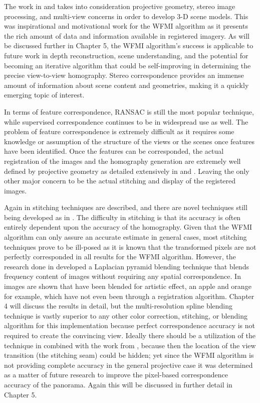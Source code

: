   The work in \cite{Walli2009} and \cite{Nilosek2009} takes into consideration projective geometry, stereo image processing, and multi-view concerns in order to develop 3-D scene models. This was inspirational and motivational work for the WFMI algorithm as it presents the rich amount of data and information available in registered imagery. As will be discussed further in Chapter 5, the WFMI algorithm's success is applicable to future work in depth reconstruction, scene understanding, and the potential for becoming an iterative algorithm that could be self-improving in determining the precise view-to-view homography. Stereo correspondence provides an immense amount of information about scene content and geometries, making it a quickly emerging topic of interest.
  
  In terms of feature correspondence, RANSAC \cite{Brown2007} is still the most popular technique, while supervised correspondence continues to be in widespread use as well. The problem of feature correspondence is extremely difficult as it requires some knowledge or assumption of the structure of the views or the scenes once features have been identified. Once the features can be corresponded, the actual  registration of the images and the homography generation are extremely well defined by projective geometry as detailed extensively in \cite{Faugeras2004} and \cite{Hartley2003}. Leaving the only other major concern to be the actual stitching and display of the registered images.
  
   Again in \cite{Zitova2003} stitching techniques are described, and there are novel techniques still being developed as in \cite{Haenselmann2009}. The difficulty in stitching is that its accuracy is often entirely dependent upon the accuracy of the homography. Given that the WFMI algorithm can only assure an accurate estimate in general cases, most stitching techniques prove to be ill-posed as it is known that the transformed pixels are not perfectly corresponded in all results for the WFMI algorithm. However, the research done in \cite{Burt1983} developed a Laplacian pyramid blending technique that blends frequency content of images without requiring any spatial correspondence. In \cite{Burt1983} images are shown that have been blended for artistic effect, an apple and orange for example, which have not even been through a registration algorithm. Chapter 4 will discuss the results in detail, but the multi-resolution spline blending technique is vastly superior to any other color correction, stitching, or blending algorithm for this implementation because perfect correspondence accuracy is not required to create the convincing view. Ideally there should be a utilization of the technique in \cite{Haenselmann2009} combined with the work from \cite{Burt1983}, because then the location of the view transition (the stitching seam) could be hidden; yet since the WFMI algorithm is not providing complete accuracy in the general projective case it was determined as a matter of future research to improve the pixel-based correspondence accuracy of the panorama. Again this will be discussed in further detail in Chapter 5.
   
